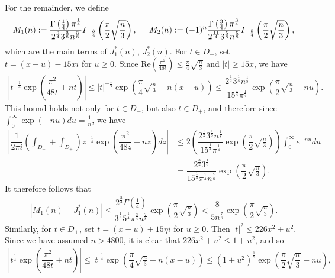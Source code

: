 \documentclass[11pt,reqno]{amsart}
\theoremstyle{definition}
\theoremstyle{plain}
\theoremstyle{named}
\numberwithin{equation}{section}
\theoremstyle{example}
\def\lp{\left(}
\def\rp{\right)}
\begin{document}
For the remainder, we define
\begin{align*}
	M_1(n) := \dfrac{\Gamma\lp \frac 14 \rp \pi^{\frac 14}}{2^{\frac 94} 3^{\frac 38} n^{\frac 38}} I_{-\frac 34} \lp \dfrac{\pi}{2} \sqrt{\dfrac{n}{3}} \rp, \hspace{0.2in} M_2(n) := (-1)^n \dfrac{\Gamma\lp \frac 34 \rp \pi^{\frac 34}}{2^{\frac{11}{4}} 3^{\frac 58} n^{\frac 58}} I_{-\frac 54}\lp \dfrac{\pi}{2} \sqrt{\dfrac{n}{3}} \rp,
\end{align*}
which are the main terms of $J_1^*(n)$, $J_2^*(n)$. For $t \in D_-$, set $t = \lp x - u \rp - 15x i$ for $u \geq 0$. Since $\mathrm{Re}\lp \frac{\pi^2}{48t} \rp \leq \frac{\pi}{4} \sqrt{\frac{n}{3}}$ and $|t| \geq 15x$, we have
\begin{align*}
	\left| t^{- \frac 14} \exp\lp \dfrac{\pi^2}{48t} + nt \rp \right| \leq |t|^{- \frac 14} \exp\lp \dfrac{\pi}{4} \sqrt{\frac{n}{3}} + n\lp x - u \rp \rp \leq \dfrac{2^{\frac 12} 3^{\frac 18} n^{\frac 18}}{15^{\frac 14} \pi^{\frac 14}} \exp\lp \dfrac{\pi}{2} \sqrt{\frac{n}{3}} - nu \rp.
\end{align*}
This bound holds not only for $t \in D_-$, but also $t \in D_+$, and therefore since $\int_0^\infty \exp\lp -nu \rp du = \frac{1}{n}$, we have
\begin{align*}
	\left| \dfrac{1}{2\pi i} \lp \int_{D_-} + \int_{D_+} \rp z^{-\frac 14} \exp\lp \dfrac{\pi^2}{48z} + nz \rp dz \right| &\leq 2 \lp \dfrac{2^{\frac 12} 3^{\frac 18} n^{\frac 18}}{15^{\frac 14} \pi^{\frac 14}} \exp\lp \dfrac{\pi}{2} \sqrt{\frac{n}{3}} \rp \rp \int_0^\infty e^{-nu} du \\ &= \dfrac{2^{\frac 32} 3^{\frac 18}}{15^{\frac 14} \pi^{\frac 14} n^{\frac 78}} \exp\lp \dfrac{\pi}{2} \sqrt{\frac{n}{3}} \rp.
\end{align*}
It therefore follows that
\begin{align*}
	\left| M_1(n) - J_1^*(n) \right| \leq \dfrac{2^{\frac 34} \Gamma\lp \frac 14 \rp}{3^{\frac 18} 5^{\frac 14} \pi^{\frac 34} n^{\frac 78}} \exp\lp \dfrac{\pi}{2} \sqrt{\frac{n}{3}} \rp < \dfrac{8}{5n^{\frac 78}} \exp\lp \dfrac{\pi}{2} \sqrt{\frac{n}{3}} \rp.
\end{align*}
Similarly, for $t \in D_\pm$, set $t = \lp x - u \rp \pm 15 \eta i$ for $u \geq 0$. Then $\left| t \right|^2 \leq 226 x^2 + u^2$. Since we have assumed $n > 4800$, it is clear that $226 x^2 + u^2 \leq 1 + u^2$, and so
\begin{align*}
	\left| t^{\frac 14} \exp\lp \dfrac{\pi^2}{48t} + nt \rp \right| \leq |t|^{\frac 14} \exp\lp \dfrac{\pi}{4} \sqrt{\frac{n}{3}} + n\lp x - u \rp \rp \leq \lp 1 + u^2 \rp^{\frac 18} \exp\lp \dfrac{\pi}{2} \sqrt{\dfrac{n}{3}} - nu \rp,
\end{align*}
\end{document}
